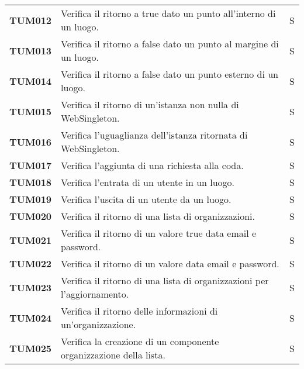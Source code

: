\documentclass[../../piano-di-qualifica.tex]{subfiles}
\begin{document}
\begin{longtable}[H]{>{\centering\bfseries}m{3cm} >{}m{10cm} >{\centering\arraybackslash}m{3cm}}
  TUM012             & Verifica il ritorno a true dato un punto all'interno di un luogo. & S\\

  TUM013             & Verifica il ritorno a false dato un punto al margine di un luogo. & S\\

  TUM014             & Verifica il ritorno a false dato un punto esterno di un luogo. & S\\

  TUM015             & Verifica il ritorno di un'istanza non nulla di WebSingleton. & S\\

  TUM016             & Verifica l'uguaglianza dell'istanza ritornata di WebSingleton. & S\\

  TUM017             & Verifica l'aggiunta di una richiesta alla coda. & S\\ %

  TUM018             & Verifica l'entrata di un utente in un luogo. & S\\ %

  TUM019             & Verifica l'uscita di un utente da un luogo. & S\\ %

  TUM020             & Verifica il ritorno di una lista di organizzazioni. & S\\ %


  TUM021             & Verifica il ritorno di un valore true data email e password. & S\\ %

  TUM022             & Verifica il ritorno di un valore data email e password. & S\\ %

  TUM023             & Verifica il ritorno di una lista di organizzazioni per l'aggiornamento. & S\\ %

  TUM024             & Verifica il ritorno delle informazioni di un'organizzazione. & S\\ %

  TUM025             & Verifica la creazione di un componente organizzazione della lista. & S\\ %


\end{longtable}
\end{document}
